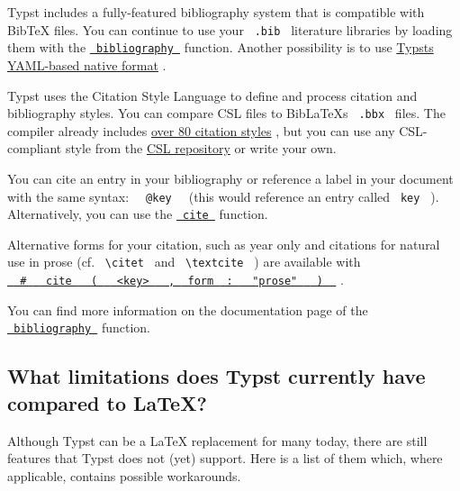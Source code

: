 Typst includes a fully-featured bibliography system that is compatible
with BibTeX files. You can continue to use your \texttt{\ .bib\ }
literature libraries by loading them with the
\href{/docs/reference/model/bibliography/}{\texttt{\ bibliography\ }}
function. Another possibility is to use
\href{https://github.com/typst/hayagriva/blob/main/docs/file-format.md}{Typst\textquotesingle s
YAML-based native format} .

Typst uses the Citation Style Language to define and process citation
and bibliography styles. You can compare CSL files to
BibLaTeX\textquotesingle s \texttt{\ .bbx\ } files. The compiler already
includes
\href{/docs/reference/model/bibliography/\#parameters-style}{over 80
citation styles} , but you can use any CSL-compliant style from the
\href{https://github.com/citation-style-language/styles}{CSL repository}
or write your own.

You can cite an entry in your bibliography or reference a label in your
document with the same syntax: \texttt{\ }{\texttt{\ @key\ }}\texttt{\ }
(this would reference an entry called \texttt{\ key\ } ). Alternatively,
you can use the \href{/docs/reference/model/cite/}{\texttt{\ cite\ }}
function.

Alternative forms for your citation, such as year only and citations for
natural use in prose (cf. \texttt{\ \textbackslash{}citet\ } and
\texttt{\ \textbackslash{}textcite\ } ) are available with
\href{/docs/reference/model/cite/\#parameters-form}{\texttt{\ }{\texttt{\ \#\ }}\texttt{\ }{\texttt{\ cite\ }}\texttt{\ }{\texttt{\ (\ }}\texttt{\ }{\texttt{\ \textless{}key\textgreater{}\ }}\texttt{\ }{\texttt{\ ,\ }}\texttt{\ form\ }{\texttt{\ :\ }}\texttt{\ }{\texttt{\ "prose"\ }}\texttt{\ }{\texttt{\ )\ }}\texttt{\ }}
.

You can find more information on the documentation page of the
\href{/docs/reference/model/bibliography/}{\texttt{\ bibliography\ }}
function.

\subsection{What limitations does Typst currently have compared to
LaTeX?}\label{limitations}

Although Typst can be a LaTeX replacement for many today, there are
still features that Typst does not (yet) support. Here is a list of them
which, where applicable, contains possible workarounds.


